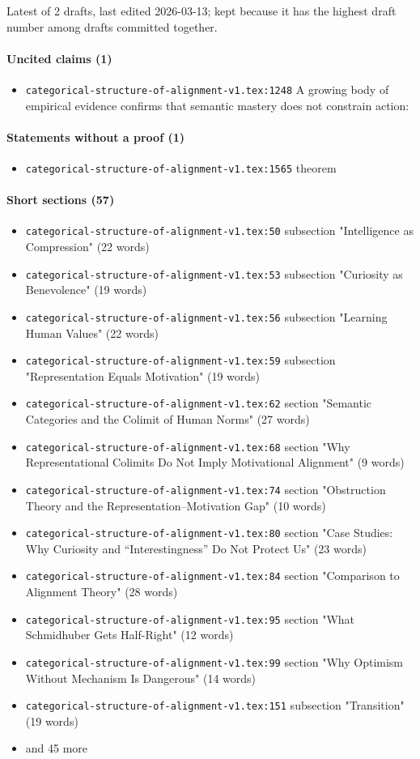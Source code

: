 \documentclass[11pt]{article}
\newcommand{\loc}[1]{{\small\color{muted}\texttt{#1}}}
\begin{document}
Latest of 2 drafts, last edited 2026-03-13; kept because it has the highest draft number among drafts committed together.

\paragraph{Uncited claims (1)}
\begin{itemize}
\item \loc{categorical-structure-of-alignment-v1.tex:1248} A growing body of empirical evidence confirms that semantic mastery does not constrain action:
\end{itemize}
\paragraph{Statements without a proof (1)}
\begin{itemize}
\item \loc{categorical-structure-of-alignment-v1.tex:1565} theorem
\end{itemize}
\paragraph{Short sections (57)}
\begin{itemize}
\item \loc{categorical-structure-of-alignment-v1.tex:50} subsection "Intelligence as Compression" (22 words)
\item \loc{categorical-structure-of-alignment-v1.tex:53} subsection "Curiosity as Benevolence" (19 words)
\item \loc{categorical-structure-of-alignment-v1.tex:56} subsection "Learning Human Values" (22 words)
\item \loc{categorical-structure-of-alignment-v1.tex:59} subsection "Representation Equals Motivation" (19 words)
\item \loc{categorical-structure-of-alignment-v1.tex:62} section "Semantic Categories and the Colimit of Human Norms" (27 words)
\item \loc{categorical-structure-of-alignment-v1.tex:68} section "Why Representational Colimits Do Not Imply Motivational Alignment" (9 words)
\item \loc{categorical-structure-of-alignment-v1.tex:74} section "Obstruction Theory and the Representation--Motivation Gap" (10 words)
\item \loc{categorical-structure-of-alignment-v1.tex:80} section "Case Studies: Why Curiosity and ``Interestingness'' Do Not Protect Us" (23 words)
\item \loc{categorical-structure-of-alignment-v1.tex:84} section "Comparison to Alignment Theory" (28 words)
\item \loc{categorical-structure-of-alignment-v1.tex:95} section "What Schmidhuber Gets Half-Right" (12 words)
\item \loc{categorical-structure-of-alignment-v1.tex:99} section "Why Optimism Without Mechanism Is Dangerous" (14 words)
\item \loc{categorical-structure-of-alignment-v1.tex:151} subsection "Transition" (19 words)
\item[] {\color{muted}\small and 45 more}
\end{itemize}
\end{document}
